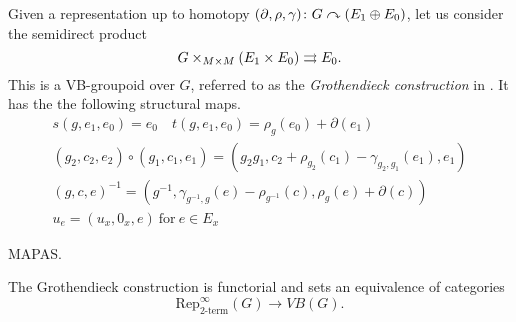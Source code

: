 Given a representation up to homotopy $(\partial, \rho, \gamma)\colon G\curvearrowright (E_1\oplus E_0)$, let us consider the semidirect product
\[ G\times_{M\times M}(E_1\times E_0) \rightrightarrows E_0 . \]
This is a VB-groupoid over $G$, referred to as the \emph{Grothendieck construction} in \cite{dho20}.
It has the the following structural maps.
\begin{gather}
  s(g, e_1, e_0) = e_0 \quad t(g, e_1, e_0) = \rho_g(e_0) + \partial(e_1) \\
  (g_2, c_2, e_2)\circ (g_1, c_1, e_1) = (g_2g_1, c_2+\rho_{g_2}(c_1)-\gamma_{g_2, g_1}(e_1), e_1) \\
  (g, c, e)^{-1} = (g^{-1}, \gamma_{g^{-1}, g}(e)-\rho_{g^{-1}}(c), \rho_g(e)+\partial(c)) \\
  u_e = (u_x, 0_x, e) \ \text{for} \ e\in E_x
\end{gather}

\noi MAPAS.

\begin{thm}\label{thm:Grothendieck}
The Grothendieck construction is functorial and sets an equivalence of categories
\[ \text{Rep}_\text{2-term}^\infty(G)\to VB(G). \]
\end{thm}















